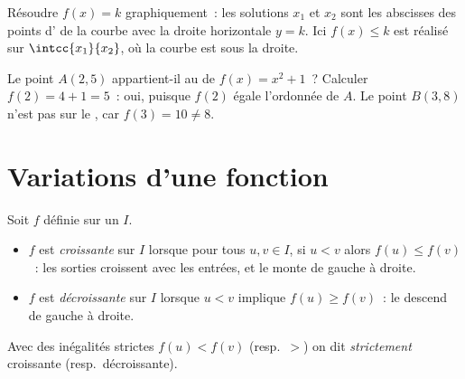 \begin{omfigure}

{\small Résoudre $f(x) = k$ graphiquement~: les solutions $x_1$ et $x_2$
sont les abscisses des points d' de la courbe avec la droite
horizontale $y = k$. Ici $f(x) \leq k$ est réalisé sur
$\intcc{x_1}{x_2}$, où la courbe est sous la droite.}
\end{omfigure}

\begin{example}\label{ex:g10:functions:membership}
Le point $A(2, 5)$ appartient-il au  de $f(x) = x^2 + 1$~?
Calculer $f(2) = 4 + 1 = 5$~: oui, puisque $f(2)$ égale l'ordonnée de
$A$. Le point $B(3, 8)$ n'est pas sur le , car
$f(3) = 10 \neq 8$.
\end{example}

\section{Variations d'une fonction}

\begin{definition}\label{def:g10:functions:variations}
Soit $f$ définie sur un  $I$.
\begin{itemize}
  \item $f$ est \emph{croissante} sur $I$
        lorsque pour tous $u, v \in I$, si $u < v$ alors
        $f(u) \leq f(v)$~: les sorties croissent avec les entrées, et le
         monte de gauche à droite.
  \item $f$ est \emph{décroissante} sur $I$
        lorsque $u < v$ implique $f(u) \geq f(v)$~: le  descend
        de gauche à droite.
\end{itemize}
Avec des inégalités strictes $f(u) < f(v)$ (resp.\ $>$) on dit
\emph{strictement} croissante (resp.\ décroissante).
\end{definition}

